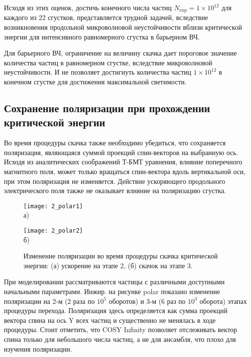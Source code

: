 \par Исходя из этих оценок, достичь конечного числа частиц $N_{\textrm{exp}}=1\times10^{12}$ для каждого из $22$ сгустков, представляется трудной задачей, вследствие возникновения продольной микроволновой неустойчивости вблизи критической энергии для интенсивного равномерного сгустка в барьерном ВЧ.

\par Для барьерного ВЧ, ограничение на величину скачка дает пороговое значение количества частиц в равномерном сгустке, вследствие микроволновой неустойчивости. И не позволяет достигнуть количества частиц $1\times10^{12}$ в конечном сгустке для достижения максимальной светимости.

	\subsection{Сохранение поляризации при прохождении критической энергии}\label{subsec:transition_jump/regular/polarization}

\par Во время процедуры скачка также необходимо убедиться, что сохраняется поляризация, являющаяся суммой проекций спин-векторов на выбранную ось. Исходя из аналитических соображений Т-БМТ уравнения, влияние поперечного магнитного поля, может только вращаться спин-вектора вдоль вертикальной оси, при этом поляризация не изменяется. Действие ускоряющего продольного электрического поля также не оказывает влияние на поляризацию сгустка.

\begin{figure}[!h]    \label{fig:polar}
    \begin{minipage}[b][][b]{0.49\linewidth}\centering
        \texttt{[image: 2\_polar1]} \\ а)
    \end{minipage}
    \hfill
    \begin{minipage}[b][][b]{0.49\linewidth}\centering
        \texttt{[image: 2\_polar2]} \\ б)
    \end{minipage}
    \caption{Изменение поляризации во время процедуры скачка критической энергии: (а) ускорение на этапе 2, (б) скачок на этапе 3.}
\end{figure}

\par При моделировании рассматриваются частицы с различными доступными начальными параметрами. Инжир. на рисунке polar показано изменение поляризации на 2-м (2 раза по $10^5$ оборотов) и 3-м (6 раз по $10^3$ оборота) этапах процедуры перехода. Поляризация здесь определяется как сумма проекций вектора спина на ось Y всех частиц и существенно не менялась в ходе процедуры. Стоит отметить, что COSY Infinity позволяет отслеживать вектор спина только для небольшого числа частиц, а не для ансамбля, что плохо для изучения поляризации.

